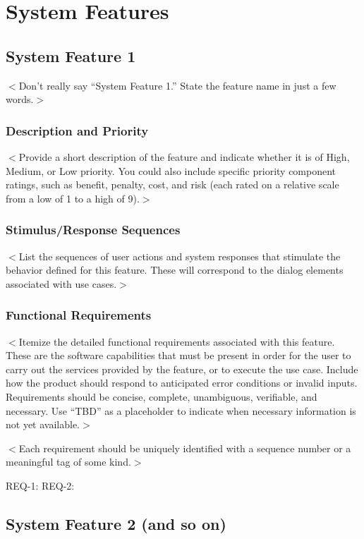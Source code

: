\documentclass{scrreprt}
\begin{document}
\chapter{System Features}

\section{System Feature 1}
$<$Don’t really say “System Feature 1.” State the feature name in just a few 
words.$>$

\subsection{Description and Priority}
$<$Provide a short description of the feature and indicate whether it is of 
High, Medium, or Low priority. You could also include specific priority 
component ratings, such as benefit, penalty, cost, and risk (each rated on a 
relative scale from a low of 1 to a high of 9).$>$

\subsection{Stimulus/Response Sequences}
$<$List the sequences of user actions and system responses that stimulate the 
behavior defined for this feature. These will correspond to the dialog elements 
associated with use cases.$>$

\subsection{Functional Requirements}
$<$Itemize the detailed functional requirements associated with this feature.  
These are the software capabilities that must be present in order for the user 
to carry out the services provided by the feature, or to execute the use case.  
Include how the product should respond to anticipated error conditions or 
invalid inputs. Requirements should be concise, complete, unambiguous, 
verifiable, and necessary. Use “TBD” as a placeholder to indicate when necessary 
information is not yet available.$>$

$<$Each requirement should be uniquely identified with a sequence number or a 
meaningful tag of some kind.$>$

REQ-1:	REQ-2:

\section{System Feature 2 (and so on)}
\end{document}
